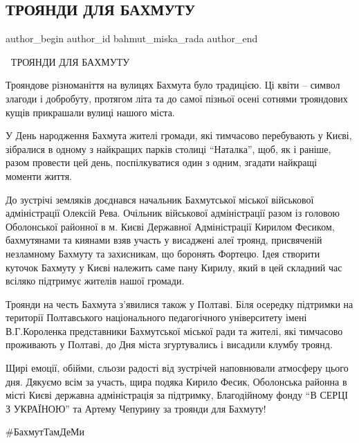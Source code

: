  
 
 
 
 

\subsection{ТРОЯНДИ ДЛЯ БАХМУТУ}
\label{sec:09_09_2023.fb.bahmut_miska_rada.1.trojandy_dlja_bahmutu}

\ifcmt
 author_begin
   author_id bahmut_miska_rada
 author_end
\fi

🌹🥀ТРОЯНДИ ДЛЯ БАХМУТУ

Трояндове різноманіття на вулицях Бахмута було традицією. Ці квіти – символ
злагоди і добробуту, протягом літа та до самої пізньої осені сотнями трояндових
кущів прикрашали вулиці нашого міста.

У День народження Бахмута жителі громади, які тимчасово перебувають у Києві,
зібралися в одному з найкращих парків столиці \enquote{Наталка}, щоб, як і раніше,
разом провести цей день, поспілкуватися один з одним, згадати найкращі моменти
життя. 

До зустрічі земляків доєднався начальник Бахмутської міської військової
адміністрації Олексій Рева. Очільник військової адміністрації разом із головою
Оболонської районної в м. Києві Державної Адміністрації Кирилом Фесиком,
бахмутянами та киянами взяв участь у висаджені алеї троянд, присвяченій
незламному Бахмуту та захисникам, що боронять Фортецю. Ідея створити куточок
Бахмуту у Києві належить саме пану Кирилу, який в цей складний час всіляко
підтримує жителів нашої громади. 

Троянди на честь Бахмута з'явилися також у Полтаві. Біля осередку підтримки на
території Полтавського національного педагогічного університету імені
В.Г.Короленка представники Бахмутської міської ради та жителі, які тимчасово
проживають у Полтаві, до Дня міста згуртувались і висадили клумбу троянд.

Щирі емоції, обійми, сльози радості від зустрічей наповнювали атмосферу цього
дня. Дякуємо всім за участь, щира подяка Кирило Фесик, Оболонська районна в
місті Києві державна адміністрація за підтримку, Благодійному фонду \enquote{В
СЕРЦІ З УКРАЇНОЮ} та Артему Чепурину за троянди для Бахмуту!

\#БахмутТамДеМи
